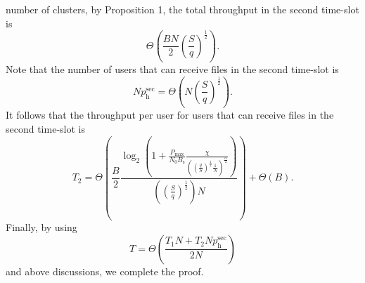 \documentclass[journal,draftclsnofoot,onecolumn,12pt,twoside]{IEEEtran}
\begin{document}
number of clusters, by Proposition 1, the total throughput in the second time-slot is 
\begin{equation}
\Theta\left(\frac{BN}{2}\left(\frac{S}{q}\right)^{\frac{1}{2}}\right).
\end{equation}
Note that the number of users that can receive files in the second time-slot is
\begin{equation}
Np_{\text{h}}^{\text{sec}}=\Theta\left(N\left(\frac{S}{q}\right)^{\frac{1}{2}}\right).
\end{equation}
It follows that the throughput per user for users that can receive files in the second time-slot is
\begin{equation}
T_2=\Theta\left(\frac{B}{2}\frac{\log_2\left(1+\frac{P_{\text{max}}}{N_0B_{\text{s}}}\frac{\chi}{\left(\left(\frac{q}{S}\right)^{\frac{1}{2}}\frac{1}{N}\right)^\frac{\alpha}{2}}\right)}{\left(\left(\frac{S}{q}\right)^{\frac{1}{2}}\right)N}\right)+\Theta(B).
\end{equation}
Finally, by using 
\begin{equation}
T=\Theta\left(\frac{T_1 N+ T_2Np_{\text{h}}^{\text{sec}} }{2N}\right)
\end{equation} 
and above discussions, we complete the proof.



%

\end{document}
